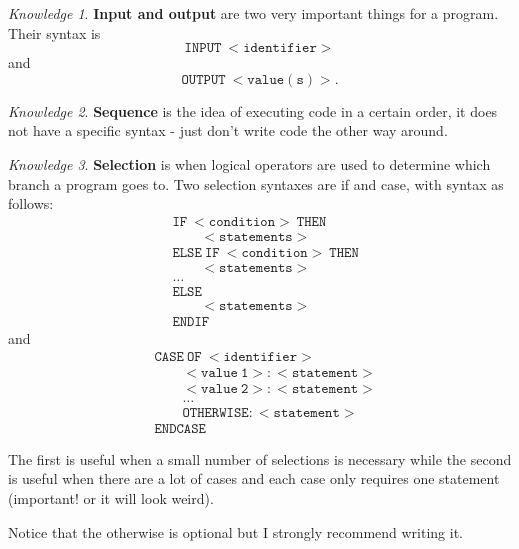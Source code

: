 \documentclass[8pt]{article}
\theoremstyle{remark}
\newtheorem{knowledge}{Knowledge}[subsection]
\begin{document}
            \begin{knowledge}
                \textbf{Input and output} are two very important things for a program. Their syntax is
                \[
                    \mathtt{INPUT\ <identifier>}
                \]
                and
                \[
                    \mathtt{OUTPUT\ <value(s)>}.
                \]
            \end{knowledge}

            \begin{knowledge}
                \textbf{Sequence} is the idea of executing code in a certain order, it does not have a specific syntax - just don't write code the other way around.
            \end{knowledge}

            \begin{knowledge}
                \textbf{Selection} is when logical operators are used to determine which branch a program goes to. Two selection syntaxes are if and case, with syntax as follows:
                \begin{align*}    
                    &\mathtt{IF\ <condition>\ THEN}\\
                    &\qquad \mathtt{<statements>}\\
                    &\mathtt{ELSE\ IF\ <condition>\ THEN}\\
                    &\qquad \mathtt{<statements>}\\
                    &\ldots\\
                    &\mathtt{ELSE}\\
                    &\qquad \mathtt{<statements>}\\
                    &\mathtt{ENDIF}
                \end{align*}
                and
                \begin{align*}
                    &\mathtt{CASE\ OF\ <identifier>}\\
                    &\qquad \mathtt{<value\ 1>:<statement>}\\
                    &\qquad \mathtt{<value\ 2>:<statement>}\\
                    &\qquad \ldots\\
                    &\qquad \mathtt{OTHERWISE:<statement>}\\
                    &\mathtt{ENDCASE}
                \end{align*}

                The first is useful when a small number of selections is necessary while the second is useful when there are a lot of cases and each case only requires one statement (important! or it will look weird).

                Notice that the otherwise is optional but I strongly recommend writing it.
            \end{knowledge}
\end{document}
